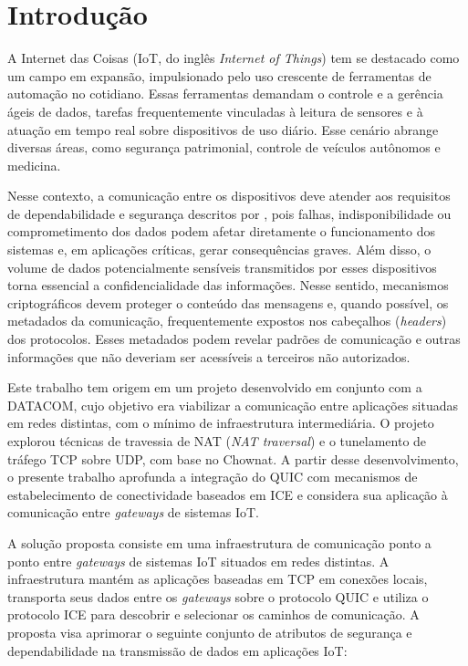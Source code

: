 \chapter{Introdução}
\label{chap:intro}

A Internet das Coisas (IoT, do inglês \textit{Internet of Things}) tem se destacado como um campo em expansão, impulsionado pelo uso crescente de ferramentas de automação no cotidiano. Essas ferramentas demandam o controle e a gerência ágeis de dados, tarefas frequentemente vinculadas à leitura de sensores e à atuação em tempo real sobre dispositivos de uso diário. Esse cenário abrange diversas áreas, como segurança patrimonial, controle de veículos autônomos e medicina.

Nesse contexto, a comunicação entre os dispositivos deve atender aos requisitos de dependabilidade e segurança descritos por \citet{Avizienis2004}, pois falhas, indisponibilidade ou comprometimento dos dados podem afetar diretamente o funcionamento dos sistemas e, em aplicações críticas, gerar consequências graves. Além disso, o volume de dados potencialmente sensíveis transmitidos por esses dispositivos torna essencial a confidencialidade das informações. Nesse sentido, mecanismos criptográficos devem proteger o conteúdo das mensagens e, quando possível, os metadados da comunicação, frequentemente expostos nos cabeçalhos (\textit{headers}) dos protocolos. Esses metadados podem revelar padrões de comunicação e outras informações que não deveriam ser acessíveis a terceiros não autorizados.

Este trabalho tem origem em um projeto desenvolvido em conjunto com a DATACOM, cujo objetivo era viabilizar a comunicação entre aplicações situadas em redes distintas, com o mínimo de infraestrutura intermediária. O projeto explorou técnicas de travessia de NAT (\textit{NAT traversal}) e o tunelamento de tráfego TCP sobre UDP, com base no Chownat. A partir desse desenvolvimento, o presente trabalho aprofunda a integração do QUIC com mecanismos de estabelecimento de conectividade baseados em ICE e considera sua aplicação à comunicação entre \textit{gateways} de sistemas IoT.

A solução proposta consiste em uma infraestrutura de comunicação ponto a ponto entre \textit{gateways} de sistemas IoT situados em redes distintas. A infraestrutura mantém as aplicações baseadas em TCP em conexões locais, transporta seus dados entre os \textit{gateways} sobre o protocolo QUIC \citep{rfc9000} e utiliza o protocolo ICE \citep{rfc8445} para descobrir e selecionar os caminhos de comunicação. A proposta visa aprimorar o seguinte conjunto de atributos de segurança e dependabilidade na transmissão de dados em aplicações IoT:

